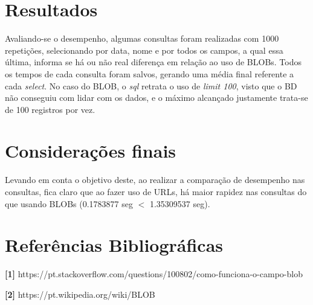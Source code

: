 \documentclass[12pt,a4paper]{article}
\begin{document}


\section{Resultados}

Avaliando-se o desempenho, algumas consultas foram realizadas com 1000 repetições, selecionando por data, nome e por todos os campos, a qual essa última, informa se há ou não real diferença em relação ao uso de BLOBs. Todos os tempos de cada consulta foram salvos, gerando uma média final referente a cada \textit{select}. No caso do BLOB, o \textit{sql} retrata o uso de \textit{limit 100}, visto que o BD não conseguiu com lidar com os dados, e o máximo alcançado justamente trata-se de 100 registros por vez.
\\\vspace{0.1cm}













\section{Considerações finais}
Levando em conta o objetivo deste, ao realizar a comparação de desempenho nas consultas, fica claro que ao fazer uso de URLs, há maior rapidez nas consultas do que usando BLOBs (0.1783877 seg $<$ 1.35309537 seg).



\section{Referências Bibliográficas}
\noindent \textbf{[1]} {https://pt.stackoverflow.com/questions/100802/como-funciona-o-campo-blob}\\\vspace{0.2cm}

\noindent \textbf{[2]} {https://pt.wikipedia.org/wiki/BLOB}\\\vspace{0.2cm}
\end{document}
